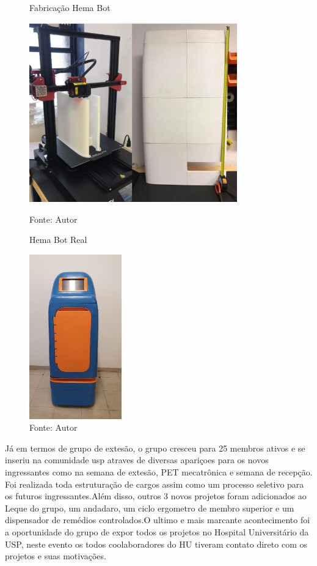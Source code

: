 \documentclass[]{politex}
\begin{document}
\begin{figure}[h]
\centering
    \begin{minipage}{0.5\textwidth}
       \centering
        \caption{Fabricação Hema Bot}
        \centering %
        \includegraphics[width=9cm]{images/fabrica_hema.png}
        \caption*{Fonte: Autor}
        \label{figura: Fabricação Hema Bot}
        
    \end{minipage}\hfill
    \begin{minipage}{0.5\textwidth}
        \centering
        \caption{Hema Bot Real}
        \centering %
        \includegraphics[width=4cm]{images/hemabotreal.jpeg}
        \caption*{Fonte: Autor}
        \label{figura: Hema Bot Real}
    \end{minipage}\hfill
\end{figure}

Já em termos de grupo de extesão, o grupo cresceu para 25 membros ativos e se inseriu na comunidade usp atraves de diversas apariçoes para os novos ingressantes como na semana de extesão, PET mecatrônica e semana de recepção. Foi realizada toda estruturação de cargos assim como um processo seletivo para os futuros ingressantes.Além disso, outros 3 novos projetos foram adicionados ao Leque do grupo, um andadaro, um ciclo ergometro de membro superior e um dispensador de remédios controlados.O ultimo e mais marcante acontecimento foi a oportunidade do grupo de expor todos os projetos no Hospital Universitário da USP, neste evento os todos coolaboradores do HU tiveram contato direto com os projetos e suas motivações.
\end{document}
